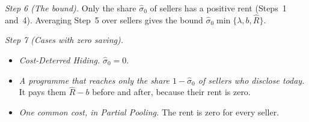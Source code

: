 \emph{Step 6 (The bound).} Only the share $\hat\sigma_0$ of sellers has a positive rent (Steps~1 and~4). Averaging Step~5 over sellers gives the bound $\hat\sigma_0\min\{\lambda,b,\hat R\}$.

\emph{Step 7 (Cases with zero saving).}
\begin{itemize}
    \item \emph{Cost-Deterred Hiding.} $\hat\sigma_0=0$.
    \item \emph{A programme that reaches only the share $1-\hat\sigma_0$ of sellers who disclose today.} It pays them $\hat R-b$ before and after, because their rent is zero.
    \item \emph{One common cost, in Partial Pooling.} The rent is zero for every seller.
\end{itemize}
